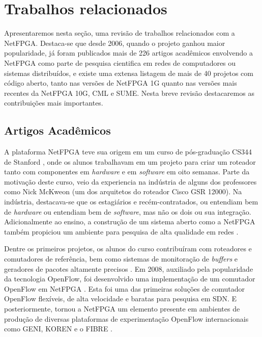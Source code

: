 \newpage
\section{Trabalhos relacionados}
\label{sec:related}

Apresentaremos nesta seção, uma revisão de trabalhos relacionados com a
NetFPGA. Destaca-se que desde 2006, quando o projeto ganhou maior
popularidade, já foram publicados mais de 226 artigos acadêmicos
envolvendo a NetFPGA como parte de pesquisa cientifica em redes de
computadores ou sistemas distribuídos, e existe uma extensa listagem de
mais de 40 projetos com código aberto, tanto nas versões de NetFPGA 1G
quanto nas versões mais recentes da NetFPGA 10G, CML e SUME. Nesta breve
revisão destacaremos as contribuições mais importantes.

\subsection{Artigos Acadêmicos}

A plataforma NetFPGA teve sua origem em um curso de pós-graduação CS344
de Stanford \cite{4589059}, onde os alunos trabalhavam em um projeto
para criar um roteador tanto com componentes em \textit{hardware} e em
\textit{software} em oito semanas. Parte da motivação deste curso, veio
da experiencia na indústria de alguns dos professores como Nick McKweon
(um dos arquitetos do roteador Cisco GSR 12000). Na indústria,
destacava-se que os estagiários e recém-contratados, ou entendiam bem de
\textit{hardware} ou entendiam bem de \textit{software}, mas não os dois
ou sua integração. Adicionalmente ao ensino, a construção de um sistema
aberto como a NetFPGA também propiciou um ambiente para pesquisa de alta
qualidade em redes \cite{Naous:2008:NRR:1397718.1397720}.

Dentre os primeiros projetos, os alunos do curso contribuíram com
roteadores e comutadores de referência, bem como sistemas de monitoração
de \emph{buffers} e geradores de pacotes altamente precisos
\cite{5290917}. Em 2008, auxiliado pela popularidade da tecnologia
OpenFlow, foi desenvolvido uma implementação de um comutador OpenFlow em
NetFPGA \cite{Naous:2008:IOS:1477942.1477944}. Esta foi uma das
primeiras soluções de comutador OpenFlow flexíveis, de alta velocidade e
baratas para pesquisa em SDN. E posteriormente, tornou a NetFPGA um
elemento presente em ambientes de produção de diversas plataformas de
experimentação OpenFlow internacionais como GENI, KOREN e o FIBRE
\cite{1649119}.

